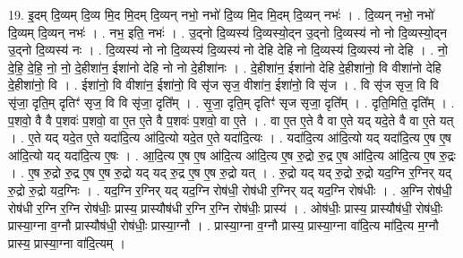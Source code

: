 \documentclass[17pt]{extarticle}
\begin{document}
19. इ॒दम् दि॒व्यम् दि॒व्य मि॒द मि॒दम् दि॒व्यन् नभो॒ नभो॑ दि॒व्य मि॒द मि॒दम् दि॒व्यन् नभः॑ । . दि॒व्यन् नभो॒ नभो॑ दि॒व्यम् दि॒व्यन् नभः॑ । . नभ॒ इति॒ नभः॑ । . उ॒द्नो दि॒व्यस्य॑ दि॒व्यस्यो॒द्न उ॒द्नो दि॒व्यस्य॑ नो नो दि॒व्यस्यो॒द्न उ॒द्नो दि॒व्यस्य॑ नः । . दि॒व्यस्य॑ नो नो दि॒व्यस्य॑ दि॒व्यस्य॑ नो देहि देहि नो दि॒व्यस्य॑ दि॒व्यस्य॑ नो देहि । . नो॒ दे॒हि॒ दे॒हि॒ नो॒ नो॒ दे॒हीशा॑न॒ ईशा॑नो देहि नो नो दे॒हीशा॑नः । . दे॒हीशा॑न॒ ईशा॑नो देहि दे॒हीशा॑नो॒ वि वीशा॑नो देहि दे॒हीशा॑नो॒ वि । . ईशा॑नो॒ वि वीशा॑न॒ ईशा॑नो॒ वि सृ॑ज सृज॒ वीशा॑न॒ ईशा॑नो॒ वि सृ॑ज । . वि सृ॑ज सृज॒ वि वि सृ॑जा॒ दृति॒म् दृतिꣳ॑ सृज॒ वि वि सृ॑जा॒ दृति᳚म् । . सृ॒जा॒ दृति॒म् दृतिꣳ॑ सृज सृजा॒ दृति᳚म् । . दृति॒मिति॒ दृति᳚म् । . प॒शवो॒ वै वै प॒शवः॑ प॒शवो॒ वा ए॒त ए॒ते वै प॒शवः॑ प॒शवो॒ वा ए॒ते । . वा ए॒त ए॒ते वै वा ए॒ते यद् यदे॒ते वै वा ए॒ते यत् । . ए॒ते यद् यदे॒त ए॒ते यदा॑दि॒त्य आ॑दि॒त्यो यदे॒त ए॒ते यदा॑दि॒त्यः । . यदा॑दि॒त्य आ॑दि॒त्यो यद् यदा॑दि॒त्य ए॒ष ए॒ष आ॑दि॒त्यो यद् यदा॑दि॒त्य ए॒षः । . आ॒दि॒त्य ए॒ष ए॒ष आ॑दि॒त्य आ॑दि॒त्य ए॒ष रु॒द्रो रु॒द्र ए॒ष आ॑दि॒त्य आ॑दि॒त्य ए॒ष रु॒द्रः । . ए॒ष रु॒द्रो रु॒द्र ए॒ष ए॒ष रु॒द्रो यद् यद् रु॒द्र ए॒ष ए॒ष रु॒द्रो यत् । . रु॒द्रो यद् यद् रु॒द्रो रु॒द्रो यद॒ग्नि र॒ग्निर् यद् रु॒द्रो रु॒द्रो यद॒ग्निः । . यद॒ग्नि र॒ग्निर् यद् यद॒ग्नि रोष॑धी॒ रोष॑धी र॒ग्निर् यद् यद॒ग्नि रोष॑धीः । . अ॒ग्नि रोष॑धी॒ रोष॑धी र॒ग्नि र॒ग्नि रोष॑धीः॒ प्रास्य॒ प्रास्यौष॑धी र॒ग्नि र॒ग्नि रोष॑धीः॒ प्रास्य॑ । . ओष॑धीः॒ प्रास्य॒ प्रास्यौष॑धी॒ रोष॑धीः॒ प्रास्या॒ग्ना व॒ग्नौ प्रास्यौष॑धी॒ रोष॑धीः॒ प्रास्या॒ग्नौ । . प्रास्या॒ग्ना व॒ग्नौ प्रास्य॒ प्रास्या॒ग्ना वा॑दि॒त्य मा॑दि॒त्य म॒ग्नौ प्रास्य॒ प्रास्या॒ग्ना वा॑दि॒त्यम् । \newline
\end{document}
